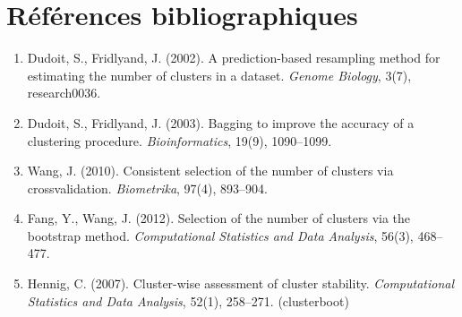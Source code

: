 \documentclass[11pt, a4paper]{article}
\begin{document}
\section{Références bibliographiques}

\begin{enumerate}
  \item Dudoit, S., Fridlyand, J. (2002). A prediction-based resampling method for estimating the number of clusters in a dataset. \textit{Genome Biology}, 3(7), research0036.
  \item Dudoit, S., Fridlyand, J. (2003). Bagging to improve the accuracy of a clustering procedure. \textit{Bioinformatics}, 19(9), 1090--1099.
  \item Wang, J. (2010). Consistent selection of the number of clusters via crossvalidation. \textit{Biometrika}, 97(4), 893--904.
  \item Fang, Y., Wang, J. (2012). Selection of the number of clusters via the bootstrap method. \textit{Computational Statistics and Data Analysis}, 56(3), 468--477.
  \item Hennig, C. (2007). Cluster-wise assessment of cluster stability. \textit{Computational Statistics and Data Analysis}, 52(1), 258--271. (clusterboot)
\end{enumerate}
\end{document}
